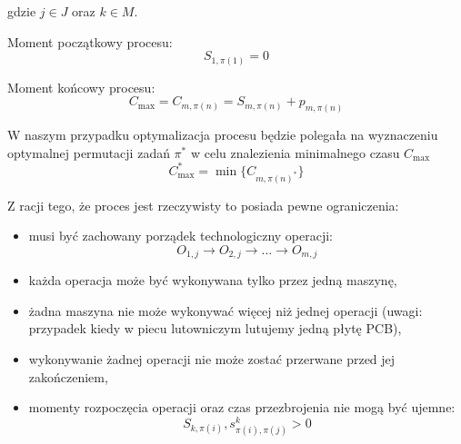 gdzie $ j \in J$ oraz $k \in M$.

\breakparagraph{}
Moment początkowy procesu:
\begin{equation}
	S_{1, \pi(1)}=0
\end{equation}

\breakparagraph{}
Moment końcowy procesu:
\begin{equation}
	C_{\max} = 	C_{m, \pi(n)} = S_{m, \pi(n)} + p_{m, \pi(n)}
\end{equation}

\breakparagraph{}
W naszym przypadku optymalizacja procesu będzie polegała na wyznaczeniu optymalnej permutacji zadań $\pi^*$
w celu znalezienia minimalnego czasu $C_{\max}$
\begin{equation}
	C_{\max}^{*} = \min\{C_{m, \pi{(n)}^{*}}\}
\end{equation}

\breakparagraph{}
Z racji tego, że proces jest rzeczywisty to posiada pewne ograniczenia:
\begin{itemize}
	\item musi być zachowany porządek technologiczny operacji:
	      \begin{equation}
	      	O_{1, j} \rightarrow O_{2, j} \rightarrow \dots \rightarrow O_{m, j}
	      \end{equation}
	\item każda operacja może być wykonywana tylko przez jedną maszynę,
	\item żadna maszyna nie może wykonywać więcej niż jednej operacji (uwagi: przypadek kiedy w piecu lutowniczym lutujemy jedną płytę PCB),
	\item wykonywanie żadnej operacji nie może zostać przerwane przed jej zakończeniem,
	\item momenty rozpoczęcia operacji oraz czas przezbrojenia nie mogą być ujemne:
	      \begin{equation}
	      	S_{k, \pi(i)}, s^{k}_{\pi(i), \pi(j)} > 0
	      \end{equation}
\end{itemize}
